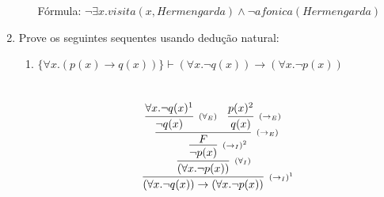 \documentclass[11pt,a4paper]{report}
\begin{document}
\begin{enumerate}
\begin{enumerate}
\begin{Solucao}
\begin{itemize}
\begin{itemize}
                          \end{itemize}
                      \end{itemize}
                      F\'ormula: $\neg \exists
                      x. visita(x,Hermengarda) \land \neg afonica(Hermengarda)$
                   \end{Solucao}
	\end{enumerate}
	\item Prove os seguintes sequentes usando dedu\c{c}\~ao natural:
	\begin{enumerate}
		\item $\{\forall x. (p(x)\rightarrow
                  q(x))\}\vdash(\forall x.\neg
                  q(x))\rightarrow(\forall x.\neg p(x))$
                  \begin{Solucao}
                    \verb| |\\
                    \[
                    \infer[\scriptstyle{(\to_I)^1}]
                            {(\forall x.\neg q(x))\to(\forall
                              x.\neg p(x))}
                            {
                              \infer[\scriptstyle{(\forall_I)}]
                                       {(\forall x.\neg p(x))}
                                       {
                                         \infer[\scriptstyle{(\to_I)^2}]
                                                  {\neg p(x)}
                                                  {
                                                    \infer[\scriptstyle{(\to_E)}]
                                                             {F}
                                                             {
                                                               \infer[\scriptstyle{(\forall_E)}]
                                                                        {\neg
                                                                          q(x)}                                                      
                                                                        {\forall
                                                                        x. \neg
                                                                      q(x)^1}
                                                                &
                                                                \infer[\scriptstyle{(\to_E)}]
                                                                        {q(x)}
                                                                         {
                                                                           p(x)^2
}}}}}\]
\end{Solucao}
\end{enumerate}
\end{enumerate}
\end{document}
